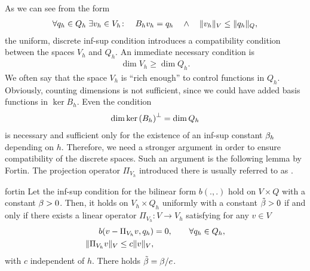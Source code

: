 \begin{intro}
  As we can see from the form
  \begin{gather}
    \forall q_h\in Q_h \;
    \exists v_h\in V_h\colon
    \quad B_h v_h = q_h
    \quad\wedge\quad
    \lVert v_h\rVert_V \le \lVert q_h\rVert_Q,
  \end{gather}
  the uniform, discrete inf-sup condition introduces a compatibility
  condition between the spaces $V_h$ and $Q_h$. An immediate necessary
  condition is
  \begin{gather}
    \dim V_h \ge \dim Q_h.
  \end{gather}
  We often say that the space $V_h$ is ``rich enough'' to control
  functions in $Q_h$. Obviously, counting dimensions is not
  sufficient, since we could have added basis functions in
  $\ker{B_h}$. Even the condition
  \begin{gather}
    \dim{\operatorname{ker}\left(B_h\right)}^\perp = \dim Q_h
  \end{gather}
  is necessary and sufficient only for the existence of an inf-sup
  constant $\beta_h$ depending on $h$. Therefore, we need a stronger
  argument in order to ensure compatibility of the discrete
  spaces. Such an argument is the following lemma by Fortin. The
  projection operator $\Pi_{V_h}$ introduced there is usually referred
  to as .
\end{intro}

\begin{Lemma}{fortin}
  Let the inf-sup condition for the bilinear form $b(.,.)$
  hold on $V\times Q$ with a constant
  $\beta>0$. Then, it holds on $V_h\times Q_h$ uniformly with a
  constant $\tilde{\beta}>0$ if and only if there exists a linear
  operator $\Pi_{V_h}\colon V\to V_h$ satisfying for any $v\in V$
  \begin{align}
    \label{eq:galerkin:15}
    b(v-\Pi_{V_h}v,q_h) &= 0,\qquad\forall q_h\in Q_h,
    \\
    \label{eq:galerkin:16}
    \lVert\Pi_{V_h}v\rVert_V \le c \lVert v\rVert_V,
  \end{align}
  with $c$ independent of $h$. There holds $\tilde{\beta} = \beta/c$.
\end{Lemma}

